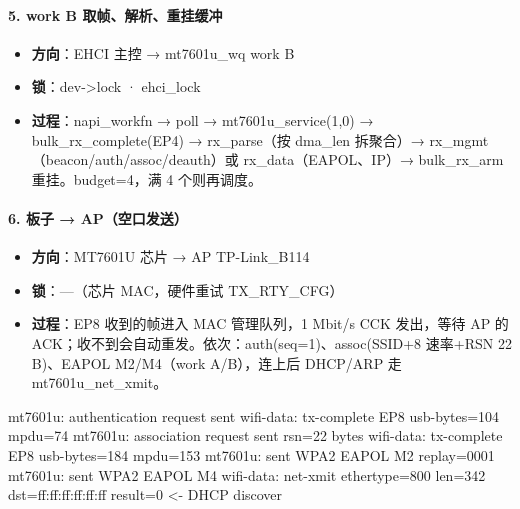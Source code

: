 \paragraph*{5. work B 取帧、解析、重挂缓冲}
\begin{itemize}[leftmargin=2em,itemsep=1pt]
\item \textbf{方向}：EHCI 主控 → mt7601u\_wq work B
\item \textbf{锁}：dev->lock · ehci\_lock
\item \textbf{过程}：napi\_workfn → poll → mt7601u\_service(1,0) → bulk\_rx\_complete(EP4) → rx\_parse（按 dma\_len 拆聚合）→ rx\_mgmt（beacon/auth/assoc/deauth）或 rx\_data（EAPOL、IP）→ bulk\_rx\_arm 重挂。budget=4，满 4 个则再调度。
\end{itemize}

\paragraph*{6. 板子 → AP（空口发送）}
\begin{itemize}[leftmargin=2em,itemsep=1pt]
\item \textbf{方向}：MT7601U 芯片 → AP TP-Link\_B114
\item \textbf{锁}：—（芯片 MAC，硬件重试 TX\_RTY\_CFG）
\item \textbf{过程}：EP8 收到的帧进入 MAC 管理队列，1 Mbit/s CCK 发出，等待 AP 的 ACK；收不到会自动重发。依次：auth(seq=1)、assoc(SSID+8 速率+RSN 22 B)、EAPOL M2/M4（work A/B），连上后 DHCP/ARP 走 mt7601u\_net\_xmit。
\end{itemize}
\begin{dbglog}
mt7601u: authentication request sent
wifi-data: tx-complete EP8 usb-bytes=104 mpdu=74
mt7601u: association request sent rsn=22 bytes
wifi-data: tx-complete EP8 usb-bytes=184 mpdu=153
mt7601u: sent WPA2 EAPOL M2 replay=0001
mt7601u: sent WPA2 EAPOL M4
wifi-data: net-xmit ethertype=800 len=342 dst=ff:ff:ff:ff:ff:ff result=0   <- DHCP discover
\end{dbglog}

